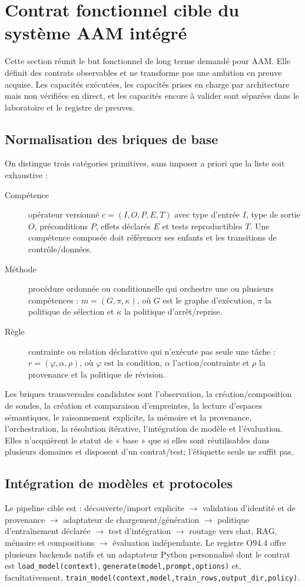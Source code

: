 \section{Contrat fonctionnel cible du système AAM intégré}
\label{sec:objectif-integral-aam}
Cette section réunit le but fonctionnel de long terme demandé pour AAM. Elle définit des contrats observables et ne transforme pas une ambition en preuve acquise. Les capacités exécutées, les capacités prises en charge par architecture mais non vérifiées en direct, et les capacités encore à valider sont séparées dans le laboratoire et le registre de preuves.

\subsection{Normalisation des briques de base}
On distingue trois catégories primitives, sans imposer a priori que la liste soit exhaustive :
\begin{description}
  \item[Compétence] opérateur versionné $c=(I,O,P,E,T)$ avec type d'entrée $I$, type de sortie $O$, préconditions $P$, effets déclarés $E$ et tests reproductibles $T$. Une compétence composée doit référencer ses enfants et les transitions de contrôle/données.
  \item[Méthode] procédure ordonnée ou conditionnelle qui orchestre une ou plusieurs compétences : $m=(G,\pi,\kappa)$, où $G$ est le graphe d'exécution, $\pi$ la politique de sélection et $\kappa$ la politique d'arrêt/reprise.
  \item[Règle] contrainte ou relation déclarative qui n'exécute pas seule une tâche : $r=(\varphi,\alpha,\rho)$, où $\varphi$ est la condition, $\alpha$ l'action/contrainte et $\rho$ la provenance et la politique de révision.
\end{description}
Les briques transversales candidates sont l'observation, la création/composition de sondes, la création et comparaison d'empreintes, la lecture d'espaces sémantiques, le raisonnement explicite, la mémoire et la provenance, l'orchestration, la résolution itérative, l'intégration de modèle et l'évaluation. Elles n'acquièrent le statut de « base » que si elles sont réutilisables dans plusieurs domaines et disposent d'un contrat/test; l'étiquette seule ne suffit pas.

\subsection{Intégration de modèles et protocoles}
Le pipeline cible est : découverte/import explicite $\to$ validation d'identité et de provenance $\to$ adaptateur de chargement/génération $\to$ politique d'entraînement déclarée $\to$ test d'intégration $\to$ routage vers chat, RAG, mémoire et compositions $\to$ évaluation indépendante. Le registre O94.4 offre plusieurs backends natifs et un adaptateur Python personnalisé dont le contrat est \texttt{load\_model(context)}, \texttt{generate(model,prompt,options)} et, facultativement, \texttt{train\_model(context,model,train\_rows,output\_dir,policy)}.

